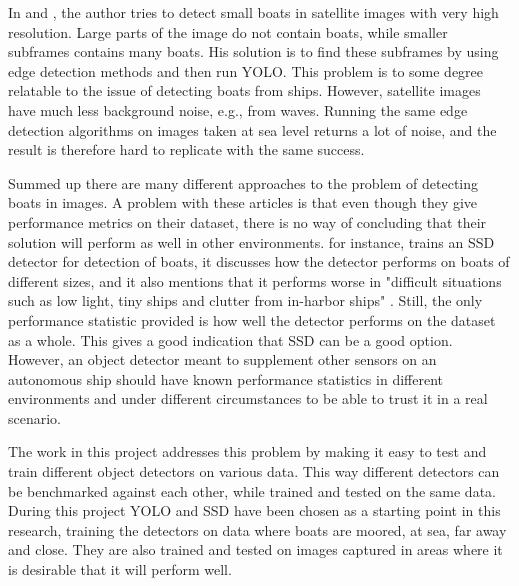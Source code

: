 In \citep{Hog1} and \citep{Hog2}, the author tries to detect small boats in satellite images with very high resolution. Large parts of the image do not contain boats, while smaller subframes contains many boats. His solution is to find these subframes by using edge detection methods and then run YOLO. This problem is to some degree relatable to the issue of detecting boats from ships. However, satellite images have much less background noise, e.g., from waves. Running the same edge detection algorithms on images taken at sea level returns a lot of noise, and the result is therefore hard to replicate with the same success. 

\vspace{3mm}

Summed up there are many different approaches to the problem of detecting boats in images. A problem with these articles is that even though they give performance metrics on their dataset, there is no way of concluding that their solution will perform as well in other environments. \citep{SSD_detection2018} for instance, trains an SSD detector for detection of boats, it discusses how the detector performs on boats of different sizes, and it also mentions that it performs worse in "difficult situations such as low light, tiny ships and clutter from in-harbor ships" \citep{SSD_detection2018}. Still, the only performance statistic provided is how well the detector performs on the dataset as a whole. This gives a good indication that SSD can be a good option. However, an object detector meant to supplement other sensors on an autonomous ship should have known performance statistics in different environments and under different circumstances to be able to trust it in a real scenario. 

\vspace{3mm}

The work in this project addresses this problem by making it easy to test and train different object detectors on various data. This way different detectors can be benchmarked against each other, while trained and tested on the same data. During this project YOLO and SSD have been chosen as a starting point in this research, training the detectors on data where boats are moored, at sea, far away and close. They are also trained and tested on images captured in areas where it is desirable that it will perform well.





\cleardoublepage